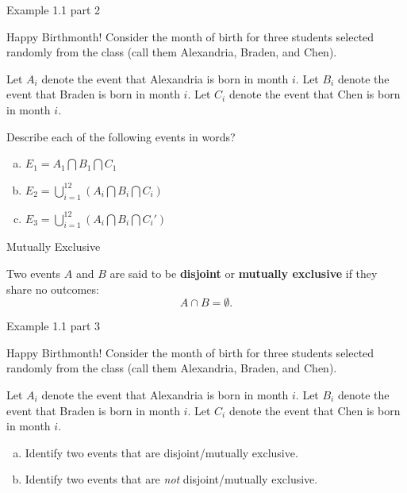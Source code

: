 \documentclass[aspectratio=169,xcolor=pdftex,dvipsnames,table]{beamer}\usepackage[]{graphicx}\usepackage[]{xcolor}
\begin{document}
\begin{frame}{Example 1.1 part 2}
  \begin{block}{Happy Birthmonth!}
    Consider the month of birth for three students selected randomly from the class (call them Alexandria, Braden, and Chen).

    \medskip
    
    Let $A_i$ denote the event that Alexandria is born in month $i$.
    Let $B_i$ denote the event that Braden is born in month $i$.
    Let $C_i$ denote the event that Chen is born in month $i$.

    \medskip
    
    Describe each of the following events in words?
    \begin{enumerate}[a)]
    \item $E_1=A_1 \bigcap B_1 \bigcap C_1$
    \item $E_2=\bigcup_{i=1}^{12} (A_i \bigcap B_i \bigcap C_i)$
    \item $E_3=\bigcup_{i=1}^{12} (A_i \bigcap B_i \bigcap C_i')$
    \end{enumerate}
  \end{block}
\end{frame}

\begin{frame}{Mutually Exclusive}

Two events $A$ and $B$ are said to be \textbf{disjoint} or \textbf{mutually exclusive} if they share no outcomes:
$$
A \cap B = \emptyset.
$$
\end{frame}

\begin{frame}{Example 1.1 part 3}
  \begin{block}{Happy Birthmonth!}
    Consider the month of birth for three students selected randomly from the class (call them Alexandria, Braden, and Chen).

    
    \medskip
    
    Let $A_i$ denote the event that Alexandria is born in month $i$.
    Let $B_i$ denote the event that Braden is born in month $i$.
    Let $C_i$ denote the event that Chen is born in month $i$.

    \medskip
    
    \begin{enumerate}[a)]
    \item Identify two events that are disjoint/mutually exclusive.
    \item Identify two events that are \textit{not} disjoint/mutually exclusive.
    \end{enumerate}
  \end{block}
\end{frame}
\end{document}
